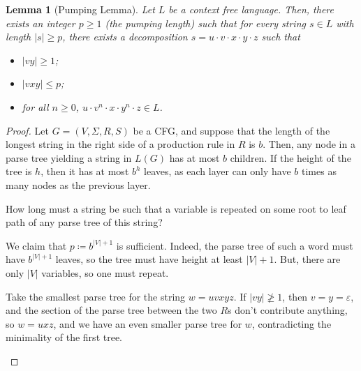 \documentclass{article}
\newtheorem{lemma}[theorem]{Lemma}
\theoremstyle{definition}
\theoremstyle{definition}
\theoremstyle{remark}
\begin{document}
\begin{lemma}[Pumping Lemma]
    Let $L$ be a context free language. Then, there exists an integer $p\geq1$ (the pumping length) such that for every string $s\in L$ with length $|s|\geq p$, there exists a decomposition $s=u\cdot v\cdot x\cdot y\cdot z$ such that
    \begin{itemize}
        \item $|vy|\geq 1$;
        \item $|vxy|\leq p$;
        \item for all $n\geq0$, $u\cdot v^n\cdot x\cdot y^n\cdot z\in L$.
    \end{itemize}
\end{lemma}
\begin{proof}
    Let $G=(V,\Sigma,R,S)$ be a CFG, and suppose that the length of the longest string in the right side of a production rule in $R$ is $b$. Then, any node in a parse tree yielding a string in $L(G)$ has at most $b$ children. If the height of the tree is $h$, then it has at most $b^h$ leaves, as each layer can only have $b$ times as many nodes as the previous layer.

    How long must a string be such that a variable is repeated on some root to leaf path of any parse tree of this string?

    We claim that $p\coloneqq b^{|V|+1}$ is sufficient. Indeed, the parse tree of such a word must have $b^{|V|+1}$ leaves, so the tree must have height at least $|V|+1$. But, there are only $|V|$ variables, so one must repeat.

    Take the smallest parse tree for the string $w=uvxyz$. If $|vy|\not\geq1$, then $v=y=\varepsilon$, and the section of the parse tree between the two $R$s don't contribute anything, so $w=uxz$, and we have an even smaller parse tree for $w$, contradicting the minimality of the first tree.
    \begin{center}
\end{center}
\end{proof}
\end{document}
